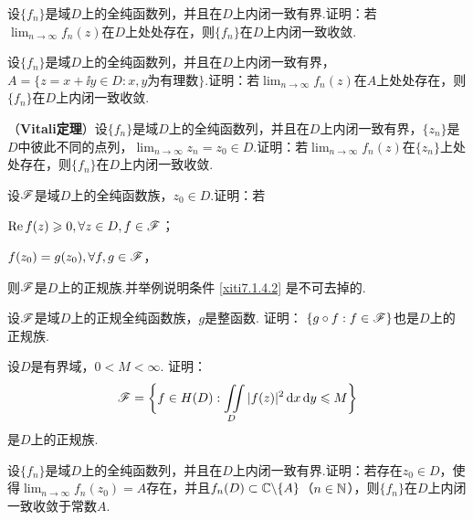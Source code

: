 \begin{xiti}
  \item 设$\{f_n\}$是域$D$上的全纯函数列，并且在$D$上内闭一致有界.证明：若$\lim_{n\to\infty}f_n(z)$在$D$上处处存在，则$\{f_n\}$在$D$上内闭一致收敛.
  \item 设$\{f_n\}$是域$D$上的全纯函数列，并且在$D$上内闭一致有界，$A=\{z=x+\ii y\in D:x,y\text{为有理数}\}$.证明：若$\lim_{n\to\infty}f_n(z)$在$A$上处处存在，则$\{f_n\}$在$D$上内闭一致收敛.
  \item （\textbf{Vitali定理}）设$\{f_n\}$是域$D$上的全纯函数列，并且在$D$上内闭一致有界，$\{z_n\}$是$D$中彼此不同的点列，$\lim_{n\to\infty}z_n=z_0\in D$.证明：若$\lim_{n\to\infty}f_n(z)$在$\{z_n\}$上处处存在，则$\{f_n\}$在$D$上内闭一致收敛.
  \item 设$\mathscr F$是域$D$上的全纯函数族，$z_0\in D$.证明：若
    \begin{enuma}
      \item $\operatorname{Re} f(z)\geqslant0,\forall z\in D,f\in\mathscr F$；
      \item \label{xiti7.1.4.2}$f(z_0)=g(z_0),\forall f,g\in\mathscr F$，
    \end{enuma}
    则$\mathscr F$是$D$上的正规族.并举例说明条件 \ref{xiti7.1.4.2} 是不可去掉的.
  \item 设$\mathscr F$是域$D$上的正规全纯函数族，$g$是整函数. 证明：
    $\{g\circ f:f\in\mathscr F\}$也是$D$上的正规族.
  \item 设$D$是有界域，$0<M<\infty$. 证明：
    \[
      \mathscr F = \bigg\{f\in H(D):\iint\limits_D|f(z)|^2\mathop{}\!\mathrm dx\mathop{}\!\mathrm dy\leqslant M\bigg\}
    \]
    是$D$上的正规族.
  \item 设$\{f_n\}$是域$D$上的全纯函数列，并且在$D$上内闭一致有界.证明：若存在$z_0\in D$，使
    得$\lim_{n\to\infty}f_n(z_0)=A$存在，并且$f_n(D)\subset\mathbb C\backslash\{A\}$（$n\in\mathbb N$），则$\{f_n\}$在$D$上内闭一致收敛于常数$A$.
\end{xiti}

